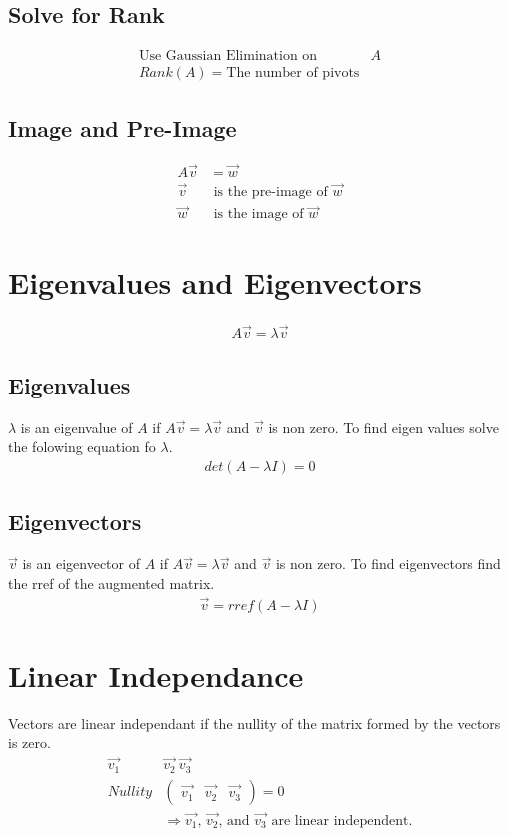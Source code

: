\documentclass[12pt]{article}
\begin{document}
\subsection{Solve for Rank}
\begin{align}
	\text{Use Gaussian Elimination on } &A\\
	Rank(A) = \text{The number of pivots}
\end{align}
\subsection{Image and Pre-Image}
\begin{align}
	A\vec{v}&=\vec{w}\\
	\vec{v}&\text{ is the pre-image of } \vec{w}\\
	\vec{w}&\text{ is the image of }\vec{w}
\end{align}
\section{Eigenvalues and Eigenvectors}
\begin{align}
	A\vec{v} = \lambda\vec{v}
\end{align}
\subsection{Eigenvalues}
$\lambda$ is an eigenvalue of $A$ if $A\vec{v} =\lambda\vec{v}$ and $\vec{v}$ is non zero. To find eigen values solve the folowing equation fo $\lambda$.
\begin{align}
	det(A-\lambda I) = 0
\end{align}
\subsection{Eigenvectors}
$\vec{v}$ is an eigenvector of $A$ if $A\vec{v}=\lambda\vec{v}$ and $\vec{v}$ is non zero. To find eigenvectors find the rref of the augmented matrix.
\begin{align}
	\vec{v} = rref(A-\lambda I)
\end{align}
\section{Linear Independance}
Vectors are linear independant if the nullity of the matrix formed by the vectors is zero.
\begin{align}
	\vec{v_{1}}\ &\vec{v_{2}}\ \vec{v_{3}}\\
	Nullity&\left(\begin{array}{ccc}\vec{v_{1}} & \vec{v_{2}} & \vec{v_{3}}\end{array}\right) = 0\\
	&\Rightarrow \text{$\vec{v_{1}}$, $\vec{v_{2}}$, and $\vec{v_{3}}$ are linear independent.}
\end{align}
\end{document}
